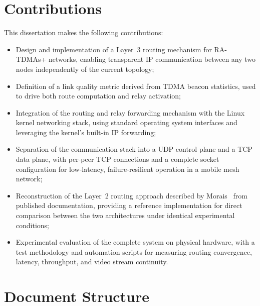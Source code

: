 \section{Contributions}
\label{sec:contributions}

This dissertation makes the following contributions:

\begin{itemize}

    \item Design and implementation of a Layer~3 routing mechanism for
    RA-TDMAs+ networks, enabling transparent IP communication between any
    two nodes independently of the current topology;

    \item Definition of a link quality metric derived from TDMA beacon
    statistics, used to drive both route computation and relay activation;

    \item Integration of the routing and relay forwarding mechanism with
    the Linux kernel networking stack, using standard operating system
    interfaces and leveraging the kernel's built-in IP forwarding;

    \item Separation of the communication stack into a UDP control plane and
    a TCP data plane, with per-peer TCP connections and a complete socket
    configuration for low-latency, failure-resilient operation in a mobile
    mesh network;

    \item Reconstruction of the Layer~2 routing approach described by
    Morais~\cite{morais2024synchronization} from published documentation,
    providing a reference implementation for direct comparison between the
    two architectures under identical experimental conditions;

    \item Experimental evaluation of the complete system on physical
    hardware, with a test methodology and automation scripts for measuring
    routing convergence, latency, throughput, and video stream continuity.

\end{itemize}

\section{Document Structure}
\label{sec:structure}

